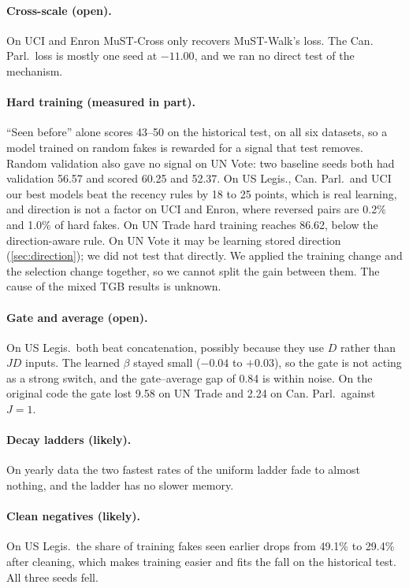 \documentclass[11pt,a4paper]{article}
\theoremstyle{remark}
\begin{document}
\paragraph{Cross-scale (open).} On UCI and Enron MuST-Cross only recovers MuST-Walk's loss. The Can. Parl.\ loss is mostly one seed at $-11.00$, and we ran no direct test of the mechanism.

\paragraph{Hard training (measured in part).} ``Seen before'' alone scores 43--50 on the historical test, on all six datasets, so a model trained on random fakes is rewarded for a signal that test removes. Random validation also gave no signal on UN Vote: two baseline seeds both had validation 56.57 and scored 60.25 and 52.37. On US Legis., Can. Parl.\ and UCI our best models beat the recency rules by 18 to 25 points, which is real learning, and direction is not a factor on UCI and Enron, where reversed pairs are 0.2\% and 1.0\% of hard fakes. On UN Trade hard training reaches 86.62, below the direction-aware rule. On UN Vote it may be learning stored direction (\cref{sec:direction}); we did not test that directly. We applied the training change and the selection change together, so we cannot split the gain between them. The cause of the mixed TGB results is unknown.

\paragraph{Gate and average (open).} On US Legis.\ both beat concatenation, possibly because they use $D$ rather than $JD$ inputs. The learned $\beta$ stayed small ($-0.04$ to $+0.03$), so the gate is not acting as a strong switch, and the gate--average gap of 0.84 is within noise. On the original code the gate lost 9.58 on UN Trade and 2.24 on Can. Parl.\ against $J=1$.

\paragraph{Decay ladders (likely).} On yearly data the two fastest rates of the uniform ladder fade to almost nothing, and the ladder has no slower memory.

\paragraph{Clean negatives (likely).} On US Legis.\ the share of training fakes seen earlier drops from 49.1\% to 29.4\% after cleaning, which makes training easier and fits the fall on the historical test. All three seeds fell.
\end{document}
